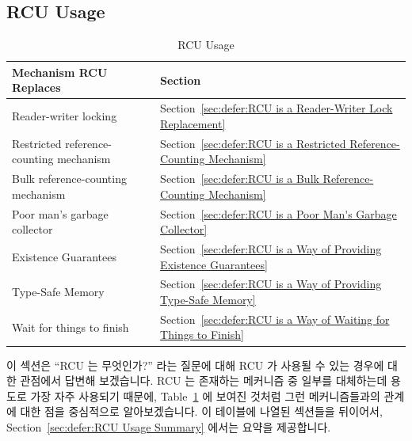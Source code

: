 
\subsection{RCU Usage}
\label{sec:defer:RCU Usage}

\begin{table}[tb]
\renewcommand*{\arraystretch}{1.2}
\centering
\small
\begin{tabular}{ll}
\toprule
Mechanism RCU Replaces & Section \\
\midrule
Reader-writer locking &
	Section~\ref{sec:defer:RCU is a Reader-Writer Lock Replacement} \\
Restricted reference-counting mechanism &
	Section~\ref{sec:defer:RCU is a Restricted Reference-Counting Mechanism} \\
Bulk reference-counting mechanism &
	Section~\ref{sec:defer:RCU is a Bulk Reference-Counting Mechanism} \\
Poor man's garbage collector &
	Section~\ref{sec:defer:RCU is a Poor Man's Garbage Collector} \\
Existence Guarantees &
	Section~\ref{sec:defer:RCU is a Way of Providing Existence Guarantees} \\
Type-Safe Memory &
	Section~\ref{sec:defer:RCU is a Way of Providing Type-Safe Memory} \\
Wait for things to finish &
	Section~\ref{sec:defer:RCU is a Way of Waiting for Things to Finish} \\
\bottomrule
\end{tabular}
\caption{RCU Usage}
\label{tab:defer:RCU Usage}
\end{table}

이 섹션은 ``RCU 는 무엇인가?'' 라는 질문에 대해 RCU 가 사용될 수 있는 경우에
대한 관점에서 답변해 보겠습니다.
RCU 는 존재하는 메커니즘 중 일부를 대체하는데 용도로 가장 자주 사용되기 때문에,
Table~\ref{tab:defer:RCU Usage} 에 보여진 것처럼 그런 메커니즘들과의 관계에
대한 점을 중심적으로 알아보겠습니다.
이 테이블에 나열된 섹션들을 뒤이어서, Section~\ref{sec:defer:RCU Usage Summary}
에서는 요약을 제공합니다.


